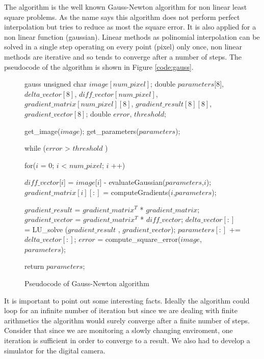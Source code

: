 The algorithm is the well known Gauss-Newton algorithm for non linear least square problems.
As the name says this algorithm does not perform perfect interpolation but tries to reduce as most the square error.
It is also applied for a non linear function (gaussian).
Linear methods as polinomial interpolation can be solved in a single step operating on every point (pixel) only once, non linear methods are iterative and so tends to converge after a  number of steps.
The pseudocode of the algorithm is shown in Figure \ref{code:gauss}.

\begin{figure}[h]
\begin{center} 
\begin{minipage}[c]{.85\textwidth} 
\centering 
\begin{pseudo}{}{gauss}
unsigned char $image[num\_pixel]$;
double $parameters$[8], $delta\_vector[8]$, $diff\_vector[num\_pixel]$, $gradient\_matrix[num\_pixel][8]$, $gradient\_result[8][8]$, $gradient\_vector[8]$;
double $error$, $threshold$;

get_image($image$);
get_parameters($parameters$);

while ($error$ > $threshold$ ) {
    for($i$ = 0; $i$ < $num\_pixel$; $i$ ++){
	
          $diff\_vector$[$i$] = $image$[$i$] - evaluateGaussian($parameters$,$i$); 
          $gradient\_matrix[i][:]$ = computeGradients($i$,$parameters$);
	      
    }
    $gradient\_result$ = $gradient\_matrix^T$ * $gradient\_matrix$;
    $gradient\_vector$ = $gradient\_matrix^T$ * $diff\_vector$;
    $delta\_vector[:]$ = LU_solve ($gradient\_result$ , $gradient\_vector$);
    $parameters[:]$ += $delta\_vector[:]$;
    $error$ = compute_square_error($image$, $parameters$);
}
return $parameters$;

\end{pseudo}
\end{minipage} 
\end{center} 
\caption{Pseudocode of Gauss-Newton algorithm}
\end{figure}

It is important to point out some interesting facts.
Ideally the algorithm could loop for an infinite number of iteration but since we are dealing with finite arithmetics the algorithm would surely converge after a finite number of steps.
Consider that since we are monitoring a slowly changing enviroment, one iteration is sufficient in order to converge to a result.
We also had to develop a simulator for the digital camera.

